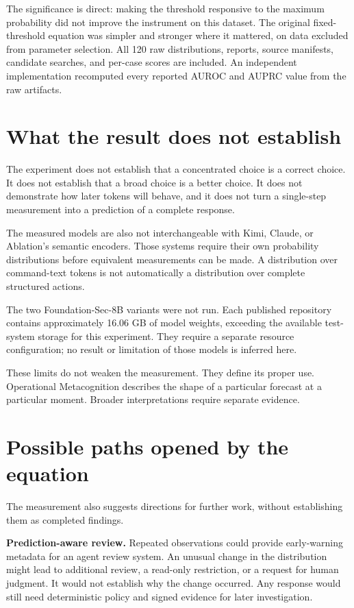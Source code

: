 \documentclass[11pt,a4paper]{article}
\begin{document}
The significance is direct: making the threshold responsive to the maximum probability did not improve the instrument on this dataset. The original fixed-threshold equation was simpler and stronger where it mattered, on data excluded from parameter selection. All 120 raw distributions, reports, source manifests, candidate searches, and per-case scores are included. An independent implementation recomputed every reported AUROC and AUPRC value from the raw artifacts.

\section{What the result does not establish}
The experiment does not establish that a concentrated choice is a correct choice. It does not establish that a broad choice is a better choice. It does not demonstrate how later tokens will behave, and it does not turn a single-step measurement into a prediction of a complete response.

The measured models are also not interchangeable with Kimi, Claude, or Ablation's semantic encoders. Those systems require their own probability distributions before equivalent measurements can be made. A distribution over command-text tokens is not automatically a distribution over complete structured actions.

The two Foundation-Sec-8B variants were not run. Each published repository contains approximately 16.06 GB of model weights, exceeding the available test-system storage for this experiment. They require a separate resource configuration; no result or limitation of those models is inferred here.

These limits do not weaken the measurement. They define its proper use. Operational Metacognition describes the shape of a particular forecast at a particular moment. Broader interpretations require separate evidence.

\section{Possible paths opened by the equation}
The measurement also suggests directions for further work, without establishing them as completed findings.

\textbf{Prediction-aware review.} Repeated observations could provide early-warning metadata for an agent review system. An unusual change in the distribution might lead to additional review, a read-only restriction, or a request for human judgment. It would not establish why the change occurred. Any response would still need deterministic policy and signed evidence for later investigation.
\end{document}
